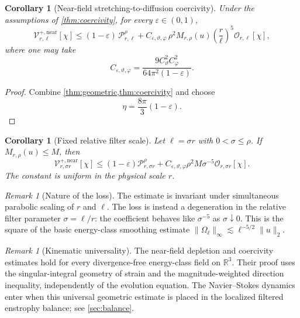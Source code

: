 \documentclass[11pt]{article}
\numberwithin{equation}{section}
\theoremstyle{plain}
\newtheorem{corollary}[theorem]{Corollary}
\theoremstyle{definition}
\theoremstyle{remark}
\newtheorem{remark}[theorem]{Remark}
\newcommand{\R}{\mathbb R}
\newcommand{\eps}{\varepsilon}
\begin{document}
\begin{corollary}[Near-field stretching-to-diffusion coercivity]\label{cor:stretching-coercivity}
Under the assumptions of \cref{thm:coercivity}, for every $\eps\in(0,1)$,
\begin{equation}\label{eq:stretching-coercivity}
\mathcal V_{r,\ell}^{+,\mathrm{near}}[\chi]
\le
(1-\eps)\,\mathcal P_{r,\ell}^{\rho}
+
C_{\eps,\vartheta,\varphi}\,
\rho^2 M_{r,\rho}(u)
\left(\frac r\ell\right)^5
\mathcal O_{r,\ell}[\chi],
\end{equation}
where one may take
\begin{equation}\label{eq:Ceps-explicit}
C_{\eps,\vartheta,\varphi}
=
\frac{9C_\vartheta^2C_\varphi^2}{64\pi^2(1-\eps)}.
\end{equation}
\end{corollary}

\begin{proof}
Combine \cref{thm:geometric,thm:coercivity} and choose
\[
\eta=\frac{8\pi}{3}(1-\eps).
\]
\end{proof}

\begin{corollary}[Fixed relative filter scale]\label{cor:fixed-ratio}
Let $\ell=\sigma r$ with $0<\sigma\le\rho$. If $M_{r,\rho}(u)\le M$, then
\begin{equation}\label{eq:fixed-ratio}
\mathcal V_{r,\sigma r}^{+,\mathrm{near}}[\chi]
\le
(1-\eps)\mathcal P_{r,\sigma r}^{\rho}
+
C_{\eps,\vartheta,\varphi}\rho^2M\sigma^{-5}
\mathcal O_{r,\sigma r}[\chi].
\end{equation}
The constant is uniform in the physical scale $r$.
\end{corollary}

\begin{remark}[Nature of the loss]\label{rem:sigma-loss}
The estimate is invariant under simultaneous parabolic scaling of $r$ and $\ell$. The loss is instead a degeneration in the relative filter parameter $\sigma=\ell/r$: the coefficient behaves like $\sigma^{-5}$ as $\sigma\downarrow0$. This is the square of the basic energy-class smoothing estimate $\|\Omega_\ell\|_\infty\lesssim\ell^{-5/2}\|u\|_2$.
\end{remark}

\begin{remark}[Kinematic universality]\label{rem:kinematic}
The near-field depletion and coercivity estimates hold for every divergence-free energy-class field on $\R^3$.  Their proof uses the singular-integral geometry of strain and the magnitude-weighted direction inequality, independently of the evolution equation.  The Navier--Stokes dynamics enter when this universal geometric estimate is placed in the localized filtered enstrophy balance; see \cref{sec:balance}.
\end{remark}
\end{document}
